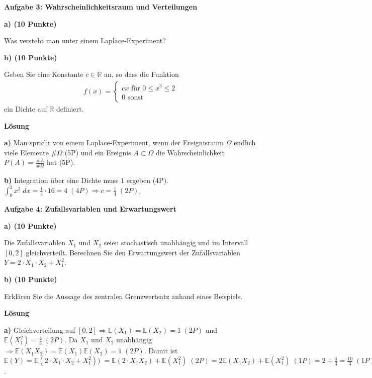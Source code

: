 \documentclass[a4paper,12pt]{article}
\begin{document}
{\bf Aufgabe 3: Wahrscheinlichkeitsraum und Verteilungen}

{\bf a) (10 Punkte) }

Was versteht man unter einem Laplace-Experiment?

{\bf b) (10 Punkte) }

Geben Sie eine Konstante $c  \in \mathbb{R}$ an, so dass die Funktion 
\begin{align*}
f(x) = \begin{cases} c x \text{ für }  0\leq x^3 \leq 2 \\ 0 \text{ sonst}\end{cases}
\end{align*}
ein Dichte auf $\mathbb{R}$ definiert.


{\bf Lösung}

{\bf a) }
Man spricht von einem Laplace-Experiment, wenn der Ereignisraum $\Omega$ endlich viele Elemente $\#\Omega$ (5P) und ein Ereignis $A \subset \Omega$ die Wahrscheinlichkeit $P(A) = \frac{\#A}{\#\Omega}$ hat (5P).

{\bf b) }
Integration über eine Dichte muss $1$ ergeben (4P).  
$\int_0^2 x^3 \; dx = \frac{1}{4} \cdot 16 = 4   \; (4P) \Rightarrow c = \frac{1}{4} \; (2P)$.


{\bf Aufgabe 4: Zufallsvariablen und Erwartungswert}

{\bf a) (10  Punkte) }

Die Zufallsvariablen $X_1$ und $X_2$ seien stochastisch unabhängig   und im Intervall $[0,2]$ gleichverteilt.
Berechnen Sie den Erwartungswert der Zufallsvariablen $Y = 2 \cdot X_1 \cdot X_2 + X_1^2$.

{\bf b) (10 Punkte) }

Erklären Sie die Aussage des zentralen Grenzwertsatz anhand eines Beispiels.



{\bf Lösung}

{\bf a) }
Gleichverteilung auf  $[0,2] \Rightarrow  \mathbb{E}(X_1) =  \mathbb{E}(X_2) = 1 \; (2P)$  und $ \mathbb{E}(X_1^2) = \frac{4}{3} \; (2P)$. Da $X_1$ und $X_2$ unabhängig $\Rightarrow \mathbb{E}(X_1 X_2) =  \mathbb{E}(X_1)  \mathbb{E}(X_2)  = 1 \; (2P)$.  Damit ist $\mathbb{E}(Y) = \mathbb{E}(  2 \cdot X_1 \cdot X_2 + X_1^2)) \; = \mathbb{E}(2 \cdot  X_1 X_2) + \mathbb{E}(X_1^2)  \; (2P) =  2 \mathbb{E}(  X_1 X_2) +  \mathbb{E}(X_1^2)  \; (1P) =   2 + \frac{4}{3} = \frac{10}{3} \; (1P)$. 
\end{document}
